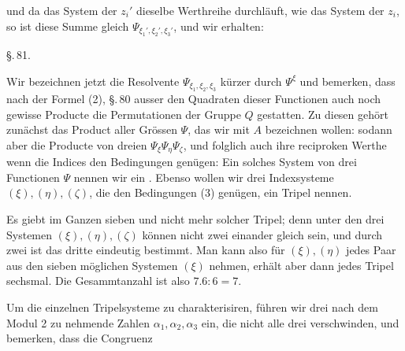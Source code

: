
und da das System der $z_i'$ dieselbe Werthreihe durchläuft, wie das System der $z_i$, so ist diese Summe gleich $\Psi_{\xi_1',\xi_2',\xi_3'}$, und wir erhalten:


\begin{center}
\S.\,81.\\
\end{center}

Wir bezeichnen jetzt die Resolvente $\Psi_{\xi_1,\xi_2,\xi_3}$ kürzer durch $\Psi^\xi$ und bemerken, dass nach der Formel (2), \S.\,80 ausser den Quadraten dieser Functionen auch noch gewisse Producte die Permutationen der Gruppe $Q$ gestatten. Zu diesen gehört zunächst das Product aller Grössen $\Psi$, das wir mit $A$ bezeichnen wollen:
sodann aber die Producte von dreien $\Psi_\xi \Psi_\eta \Psi_\zeta$, und folglich auch ihre reciproken Werthe
wenn die Indices den Bedingungen genügen:
Ein solches System von drei Functionen $\Psi$ nennen wir ein . Ebenso wollen wir drei Indexsysteme $(\xi), (\eta), (\zeta)$, die den Bedingungen (3) genügen, ein Tripel nennen.

Es giebt im Ganzen sieben und nicht mehr solcher Tripel; denn unter den drei Systemen $(\xi), (\eta), (\zeta)$ können nicht zwei einander gleich sein, und durch zwei ist das dritte eindeutig bestimmt. Man kann also für $(\xi), (\eta)$ jedes Paar aus den sieben möglichen Systemen $(\xi)$ nehmen, erhält aber dann jedes Tripel sechsmal. Die Gesammtanzahl ist also $7 . 6 : 6 = 7$.

Um die einzelnen Tripelsysteme zu charakterisiren, führen wir drei nach dem Modul 2 zu nehmende Zahlen $\alpha_1, \alpha_2, \alpha_3$ ein, die nicht alle drei verschwinden, und bemerken, dass die Congruenz

